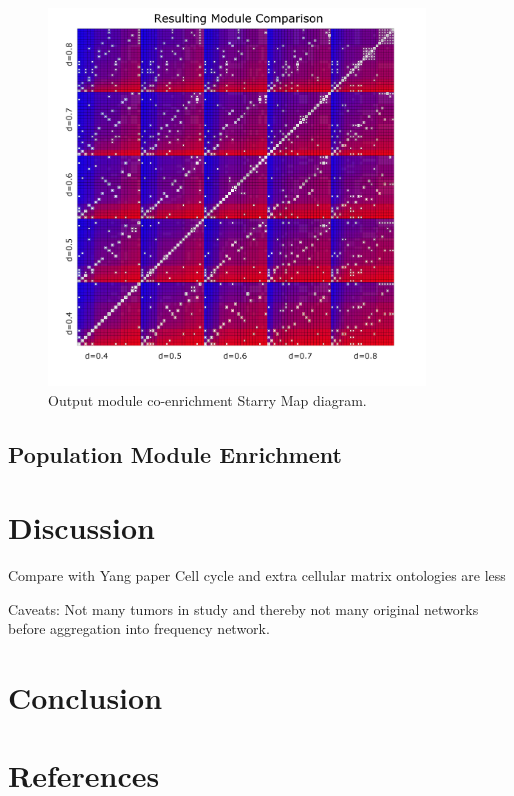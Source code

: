 \documentclass[11pt,twoside,a4paper]{article}
\begin{document}
\begin{figure}[t]
\centering
\includegraphics[width=100mm]{Figures/moduleStaryNight}
\caption{Output module co-enrichment Starry Map diagram.}
\label{Starry Map Figure}
\end{figure}

\subsection{Population Module Enrichment}
\section{Discussion}
Compare with Yang paper
Cell cycle and extra cellular matrix ontologies are less 

Caveats:
	Not many tumors in study and thereby not many original networks before aggregation into frequency network.
\section{Conclusion}
\section{References}
\end{document}
